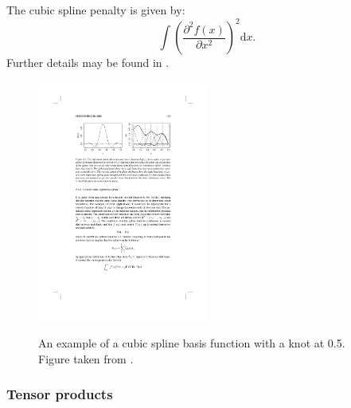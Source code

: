 The cubic spline penalty is given by:
\begin{equation*}
\int\left( \frac{\partial^2 f(x)}{\partial x^2} \right)^2 \text{d}x.
\end{equation*}
Further details may be found in .

\begin{figure}[tb]
\centering
\includegraphics[width=0.5\textwidth]{intro/figs/cubic.pdf}\\
\caption{An example of a cubic spline basis function with a knot at 0.5. Figure taken from .}
\label{cs-basis}
\end{figure}


\subsubsection{Tensor products}
\label{GAMtensor}

